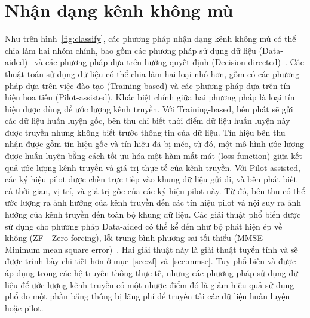 \section{Nhận dạng kênh không mù}
Như trên hình~\ref{fig:classify}, các phương pháp nhận dạng kênh không mù có thể chia làm hai nhóm chính, bao gồm các phương pháp sử dụng dữ liệu (Data-aided)~\cite{vilas2022} và các phương pháp dựa trên hướng quyết định (Decision-directed)~\cite{Ozdemir2007}. Các thuật toán sử dụng dữ liệu có thể chia làm hai loại nhỏ hơn, gồm có các phương pháp dựa trên việc đào tạo (Training-based) và các phương pháp dựa trên tín hiệu hoa tiêu (Pilot-assisted). Khác biệt chính giữa hai phương pháp là loại tín hiệu được dùng để ước lượng kênh truyền. Với Training-based, bên phát sẽ gửi các dữ liệu huấn luyện gốc, bên thu chỉ biết thời điểm dữ liệu huấn luyện này được truyền nhưng không biết trước thông tin của dữ liệu. Tín hiệu bên thu nhận được gồm tín hiệu gốc và tín hiệu đã bị méo, từ đó, một mô hình ước lượng được huấn luyện bằng cách tối ưu hóa một hàm mất mát (loss function) giữa kết quả ước lượng kênh truyền và giá trị thực tế của kênh truyền. Với Pilot-assisted, các ký hiệu pilot được chèn trực tiếp vào khung dữ liệu gửi đi, và bên phát biết cả thời gian, vị trí, và giá trị gốc của các ký hiệu pilot này. Từ đó, bên thu có thể ước lượng ra ảnh hưởng của kênh truyền đến các tín hiệu pilot và nội suy ra ảnh hưởng của kênh truyền đến toàn bộ khung dữ liệu. Các giải thuật phổ biến được sử dụng cho phương pháp Data-aided có thể kể đến như bộ phát hiện ép về không (ZF - Zero forcing), lỗi trung bình phương sai tối thiểu (MMSE - Minimum mean square error)~\cite{Jiang2011}. Hai giải thuật này là giải thuật tuyến tính và sẽ được trình bày chi tiết hơn ở mục~\ref{sec:zf} và~\ref{sec:mmse}. Tuy phổ biến và được áp dụng trong các hệ truyền thông thực tế, nhưng các phương pháp sử dụng dữ liệu để ước lượng kênh truyền có một nhược điểm đó là giảm hiệu quả sử dụng phổ do một phần băng thông bị lãng phí để truyền tải các dữ liệu huấn luyện hoặc pilot. 

